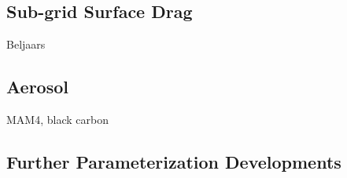 \subsection{Sub-grid Surface Drag}
Beljaars
\subsection{Aerosol}
MAM4, black carbon
\subsection{Further Parameterization Developments}